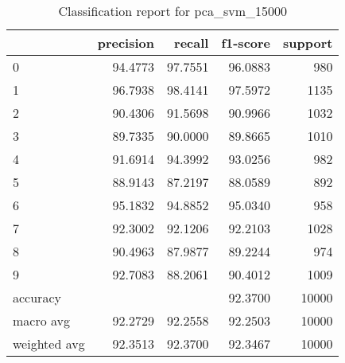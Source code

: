 \begin{table}[htb!]
\centering
\begin{tabular}{lrrrr}
    \toprule
    & precision & recall & f1-score & support \\
    \midrule
    0 & 94.4773 & 97.7551 & 96.0883 & 980 \\
    1 & 96.7938 & 98.4141 & 97.5972 & 1135 \\
    2 & 90.4306 & 91.5698 & 90.9966 & 1032 \\
    3 & 89.7335 & 90.0000 & 89.8665 & 1010 \\
    4 & 91.6914 & 94.3992 & 93.0256 & 982 \\
    5 & 88.9143 & 87.2197 & 88.0589 & 892 \\
    6 & 95.1832 & 94.8852 & 95.0340 & 958 \\
    7 & 92.3002 & 92.1206 & 92.2103 & 1028 \\
    8 & 90.4963 & 87.9877 & 89.2244 & 974 \\
    9 & 92.7083 & 88.2061 & 90.4012 & 1009 \\
    accuracy & & & 92.3700 & 10000 \\
    macro avg & 92.2729 & 92.2558 & 92.2503 & 10000 \\
    weighted avg & 92.3513 & 92.3700 & 92.3467 & 10000 \\
    \bottomrule
\end{tabular}
\caption{Classification report for pca\_svm\_15000}
\label{tab:classification-report-pca_svm_15000}
\end{table}
